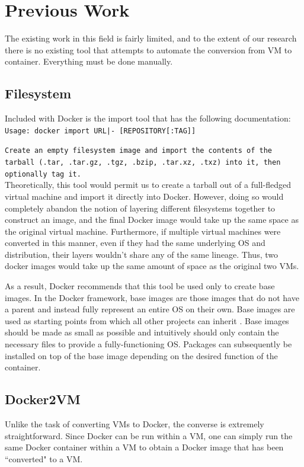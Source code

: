 \documentclass[\myfontsize, letterpaper]{article}
\begin{document}
\section{Previous Work}
\label{sec:prevwork}
The existing work in this field is fairly limited, and to the extent of our research there is no existing tool that attempts to automate the conversion from VM to container. Everything must be done manually.


\subsection{Filesystem}

Included with Docker is the import tool that has the following documentation:\\

\texttt{Usage: docker import URL|- [REPOSITORY[:TAG]]}

\texttt{Create an empty filesystem image and import the contents of the tarball (.tar, .tar.gz, .tgz, .bzip, .tar.xz, .txz) into it, then optionally tag it.} \\

Theoretically, this tool would permit us to create a tarball out of a full-fledged virtual machine and import it directly into Docker. However, doing so would completely abandon the notion of layering different filesystems together to construct an image, and the final Docker image would take up the same space as the original virtual machine. Furthermore, if multiple virtual machines were converted in this manner, even if they had the same underlying OS and distribution, their layers wouldn't share any of the same lineage. Thus, two docker images would take up the same amount of space as the original two VMs. 

As a result, Docker recommends that this tool be used only to create base images. In the Docker framework, base images are those images that do not have a parent and instead fully represent an entire OS on their own. Base images are used as starting points from which all other projects can inherit \cite{baseimage}. Base images should be made as small as possible and intuitively should only contain the necessary files to provide a fully-functioning OS. Packages can subsequently be installed on top of the base image depending on the desired function of the container. 

\subsection{Docker2VM}
Unlike the task of converting VMs to Docker, the converse is extremely straightforward. Since Docker can be run within a VM, one can simply run the same Docker container within a VM to obtain a Docker image that has been ``converted" to a VM.
\end{document}
